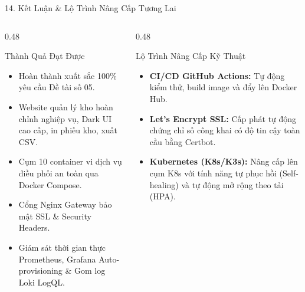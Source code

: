 \documentclass[aspectratio=169,10pt]{beamer}
\begin{document}
\begin{frame}{14. Kết Luận \& Lộ Trình Nâng Cấp Tương Lai}
    \begin{columns}[T]
        \begin{column}{0.48\textwidth}
            \begin{block}{Thành Quả Đạt Được}
                \begin{itemize}
                    \item Hoàn thành xuất sắc 100\% yêu cầu Đề tài số 05.
                    \item Website quản lý kho hoàn chỉnh nghiệp vụ, Dark UI cao cấp, in phiếu kho, xuất CSV.
                    \item Cụm 10 container vi dịch vụ điều phối an toàn qua Docker Compose.
                    \item Cổng Nginx Gateway bảo mật SSL \& Security Headers.
                    \item Giám sát thời gian thực Prometheus, Grafana Auto-provisioning \& Gom log Loki LogQL.
                \end{itemize}
            \end{block}
        \end{column}

        \begin{column}{0.48\textwidth}
            \begin{exampleblock}{Lộ Trình Nâng Cấp Kỹ Thuật}
                \begin{itemize}
                    \item \textbf{CI/CD GitHub Actions:} Tự động kiểm thử, build image và đẩy lên Docker Hub.
                    \item \textbf{Let's Encrypt SSL:} Cấp phát tự động chứng chỉ số công khai có độ tin cậy toàn cầu bằng Certbot.
                    \item \textbf{Kubernetes (K8s/K3s):} Nâng cấp lên cụm K8s với tính năng tự phục hồi (Self-healing) và tự động mở rộng theo tải (HPA).
                \end{itemize}
            \end{exampleblock}
        \end{column}
    \end{columns}
\end{frame}
\end{document}

